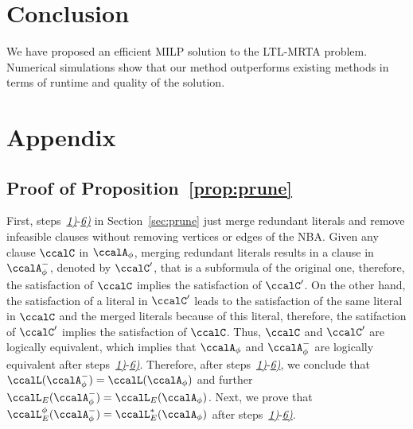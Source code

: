 \documentclass[Afour,sageh,times]{sagej}
\newcommand{\autop}{\ccalA_{\phi}}
\begin{document}
{\section{Conclusion}
We have proposed an efficient MILP solution to the LTL-MRTA problem. Numerical simulations show that our method outperforms existing methods in terms of runtime and quality of the solution.

\section{Appendix}\label{sec:appendix}
\subsection{Proof of Proposition~\ref{prop:prune}}\label{app:prune}
First, steps~\hyperref[prune:exclusion1]{\it 1)}-\hyperref[prune:violation2]{\it 6)} in Section~\ref{sec:prune} just merge redundant literals and remove infeasible clauses without removing vertices or edges  of the NBA. Given any clause $\ccalC$ in $\autop$, merging redundant literals results in a clause in $\autop^-$, denoted by $\ccalC'$, that is a subformula of the original one, therefore, the satisfaction of $\ccalC$ implies the satisfaction of $\ccalC'$. On the other hand, the satisfaction of a literal in $\ccalC'$ leads to the satisfaction of the same literal in $\ccalC$ and the merged literals because of this literal, therefore, the satifaction of $\ccalC'$ implies the satisfaction of $\ccalC$. Thus, $\ccalC$ and $\ccalC'$ are logically equivalent, which implies that $\autop$ and $\autop^-$ are logically equivalent after steps~\hyperref[prune:exclusion1]{\it 1)}-\hyperref[prune:violation2]{\it 6)}. Therefore, after steps~\hyperref[prune:exclusion1]{\it 1)}-\hyperref[prune:violation2]{\it 6)}, we conclude that  $\ccalL(\autop^-)= \ccalL(\autop)$ and further $\ccalL_E(\autop^-)= \ccalL_E(\autop)$. Next, we prove that $\ccalL_E^\phi(\autop^-) = \ccalL^*_E(\autop)$ after steps~\hyperref[prune:exclusion1]{\it 1)}-\hyperref[prune:violation2]{\it 6)}.

}
\end{document}
